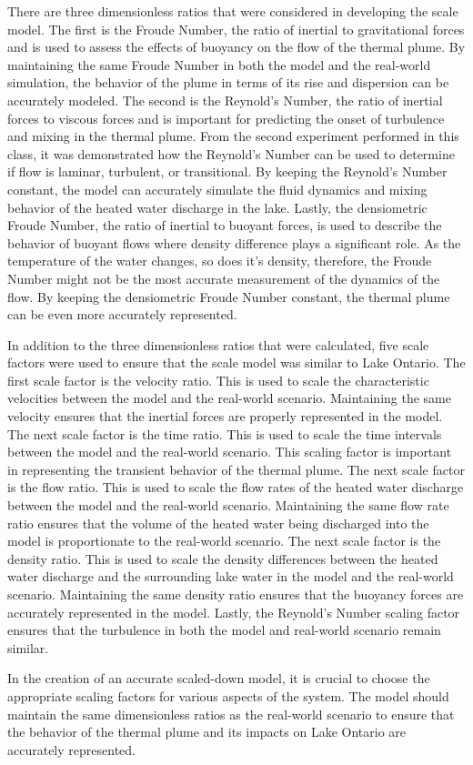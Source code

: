 \documentclass{article}
\begin{document}
\par There are three dimensionless ratios that were considered in developing the scale model. The first is the Froude Number, the ratio of inertial to gravitational forces and is used to assess the effects of buoyancy on the flow of the thermal plume. By maintaining the same Froude Number in both the model and the real-world simulation, the behavior of the plume in terms of its rise and dispersion can be accurately modeled. The second is the Reynold's Number, the ratio of inertial forces to viscous forces and is important for predicting the onset of turbulence and mixing in the thermal plume. From the second experiment performed in this class, it was demonstrated how the Reynold's Number can be used to determine if flow is laminar, turbulent, or transitional. By keeping the Reynold's Number constant, the model can accurately simulate the fluid dynamics and mixing behavior of the heated water discharge in the lake. Lastly, the densiometric Froude Number, the ratio of inertial to buoyant forces, is used to describe the behavior of buoyant flows where density difference plays a significant role. As the temperature of the water changes, so does it's density, therefore, the Froude Number might not be the most accurate measurement of the dynamics of the flow. By keeping the densiometric Froude Number constant, the thermal plume can be even more accurately represented.
\par In addition to the three dimensionless ratios that were calculated, five scale factors were used to ensure that the scale model was similar to Lake Ontario. The first scale factor is the velocity ratio. This is used to scale the characteristic velocities between the model and the real-world scenario. Maintaining the same velocity ensures that the inertial forces are properly represented in the model. The next scale factor is the time ratio. This is used to scale the time intervals between the model and the real-world scenario. This scaling factor is important in representing the transient behavior of the thermal plume. The next scale factor is the flow ratio. This is used to scale the flow rates of the heated water discharge between the model and the real-world scenario. Maintaining the same flow rate ratio ensures that the volume of the heated water being discharged into the model is proportionate to the real-world scenario. The next scale factor is the density ratio. This is used to scale the density differences between the heated water discharge and the surrounding lake water in the model and the real-world scenario. Maintaining the same density ratio ensures that the buoyancy forces are accurately represented in the model. Lastly, the Reynold's Number scaling factor ensures that the turbulence in both the model and real-world scenario remain similar. 
\par In the creation of an accurate scaled-down model, it is crucial to choose the appropriate scaling factors for various aspects of the system. The model should maintain the same dimensionless ratios as the real-world scenario to ensure that the behavior of the thermal plume and its impacts on Lake Ontario are accurately represented. 
\end{document}
